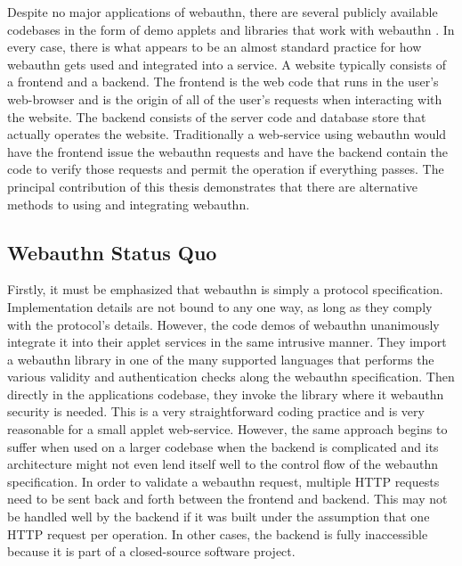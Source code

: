 Despite no major applications of webauthn, there are several publicly available codebases in the form of demo applets and libraries that work with webauthn \cite{TODO-webauthn-codebases-from-webauthn-website}. In every case, there is what appears to be an almost standard practice for how webauthn gets used and integrated into a service. A website typically consists of a frontend and a backend. The frontend is the web code that runs in the user's web-browser and is the origin of all of the user's requests when interacting with the website. The backend consists of the server code and database store that actually operates the website. Traditionally a web-service using webauthn would have the frontend issue the webauthn requests and have the backend contain the code to verify those requests and permit the operation if everything passes. The principal contribution of this thesis demonstrates that there are alternative methods to using and integrating webauthn.

\subsection{Webauthn Status Quo}

Firstly, it must be emphasized that webauthn is simply a protocol specification. Implementation details are not bound to any one way, as long as they comply with the protocol's details. However, the code demos of webauthn unanimously integrate it into their applet services in the same intrusive manner. They import a webauthn library in one of the many supported languages \cite{TODO-webauthn-libraries} that performs the various validity and authentication checks along the webauthn specification. Then directly in the applications codebase, they invoke the library where it webauthn security is needed. This is a very straightforward coding practice and is very reasonable for a small applet web-service. However, the same approach begins to suffer when used on a larger codebase when the backend is complicated and its architecture might not even lend itself well to the control flow of the webauthn specification. In order to validate a webauthn request, multiple HTTP requests need to be sent back and forth between the frontend and backend. This may not be handled well by the backend if it was built under the assumption that one HTTP request per operation. In other cases, the backend is fully inaccessible because it is part of a closed-source software project. 

